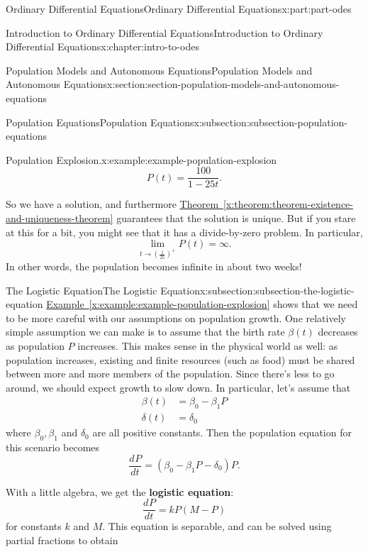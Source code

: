 \documentclass[twoside,10pt,]{book}
\newcommand{\xreffont}{\relax}
\newcommand{\terminology}[1]{\textbf{#1}}
\numberwithin{equation}{part}
\providecommand{\dv}[3][]{\dfrac{d^{#1} #2}{d #3^{#1}}}
\begin{document}
\begin{partptx}{Ordinary Differential Equations}{}{Ordinary Differential Equations}{}{}{x:part:part-odes}
\begin{chapterptx}{Introduction to Ordinary Differential Equations}{}{Introduction to Ordinary Differential Equations}{}{}{x:chapter:intro-to-odes}
\begin{sectionptx}{Population Models and Autonomous Equations}{}{Population Models and Autonomous Equations}{}{}{x:section:section-population-models-and-autonomous-equations}
\begin{subsectionptx}{Population Equations}{}{Population Equations}{}{}{x:subsection:subsection-population-equations}
\begin{example}{Population Explosion.}{x:example:example-population-explosion}
\begin{equation*}
P(t) = \frac{100}{1 - 25t}.
\end{equation*}
%
\par
So we have a solution, and furthermore \hyperref[x:theorem:theorem-existence-and-uniqueness-theorem]{Theorem~{\xreffont\ref{x:theorem:theorem-existence-and-uniqueness-theorem}}} guarantees that the solution is unique. But if you stare at this for a bit, you might see that it has a divide-by-zero problem. In particular,%
\begin{equation*}
\lim_{t\to(\frac{1}{25})^{+}}P(t) = \infty.
\end{equation*}
In other words, the population becomes infinite in about two weeks!%
\end{example}
\end{subsectionptx}
%
%
\typeout{************************************************}
\typeout{************************************************}
%
\begin{subsectionptx}{The Logistic Equation}{}{The Logistic Equation}{}{}{x:subsection:subsection-the-logistic-equation}
\hyperref[x:example:example-population-explosion]{Example~{\xreffont\ref{x:example:example-population-explosion}}} shows that we need to be more careful with our assumptions on population growth. One relatively simple assumption we can make is to assume that the birth rate \(\beta(t)\) decreases as population \(P\) increases. This makes sense in the physical world as well: as population increases, existing and finite resources (such as food) must be shared between more and more members of the population. Since there's less to go around, we should expect growth to slow down. In particular, let's assume that%
\begin{align*}
\beta(t) & = \beta_{0} - \beta_{1}P \\
\delta(t) & = \delta_{0} 
\end{align*}
where \(\beta_{0},\beta_{1}\) and \(\delta_{0}\) are all positive constants. Then the population equation for this scenario becomes%
\begin{equation*}
\dv{P}{t} = (\beta_{0} - \beta_{1}P - \delta_{0})P.
\end{equation*}
%
\par
With a little algebra, we get the \terminology{logistic equation}:%
\begin{equation*}
\dv{P}{t} = kP(M-P)
\end{equation*}
for constants \(k\) and \(M\). This equation is separable, and can be solved using partial fractions to obtain%

\end{subsectionptx}
\end{sectionptx}
\end{chapterptx}
\end{partptx}
\end{document}
